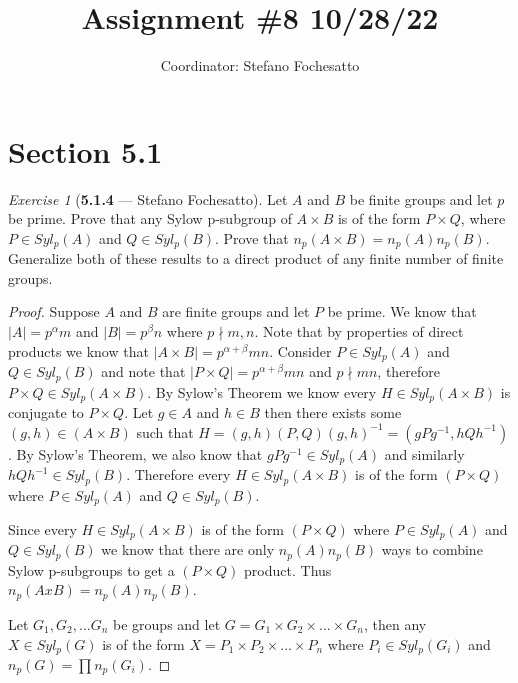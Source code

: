 \documentclass[12pt]{amsart}
\title{Assignment \#8 10/28/22}
\author{Coordinator: Stefano Fochesatto}
\theoremstyle{remark}
\newtheorem*{exercise}{Exercise}%
\theoremstyle{mycomment}
\begin{document}
\maketitle
\doublespacing %

\section*{Section 5.1}
\begin{exercise}[\textbf{5.1.4} --- Stefano Fochesatto] Let $A$ and $B$ be finite groups and let $p$ be prime. Prove that any Sylow p-subgroup of $A\times B$
  is of the form $P\times Q$, where $P \in Syl_p(A)$ and $Q \in Syl_p(B)$. Prove that $n_p(A\times B) = n_p(A)n_p(B)$. Generalize both of these results 
  to a direct product of any finite number of finite groups.
  \begin{proof} Suppose $A$ and $B$ are finite groups and let $P$ be prime. We know that $|A| = p^{\alpha}m$ and $|B| = p^{\beta}n$ where $p \nmid m, n$.
    Note that by properties of direct products we know that $|A \times B| = p^{\alpha + \beta}mn$. Consider $P \in Syl_p(A)$ and $Q \in Syl_p(B)$ and note that $|P \times Q| = p^{\alpha + \beta}mn$ and $p \nmid mn$, therefore $P \times Q \in Syl_p(A \times B)$. By Sylow's Theorem we know every $H \in Syl_p(A\times B)$ is conjugate to $P \times Q$. Let $g \in A$ and $h \in B$ then there exists some $(g, h) \in (A \times B)$ such that $H = (g, h)(P, Q)(g, h)^{-1} = (gPg^{-1}, hQh^{-1})$. By Sylow's Theorem, we also know that $gPg^{-1} \in Syl_p(A)$ and similarly $hQh^{-1} \in Syl_p(B)$. Therefore every $H \in Syl_p(A\times B)$ is of the form $(P\times Q)$ where $P \in Syl_p(A)$ and $Q \in Syl_p(B)$.


    Since every $H \in Syl_p(A\times B)$ is of the form $(P\times Q)$ where $P \in Syl_p(A)$ and $Q \in Syl_p(B)$ we know that there are only 
    $n_p(A)n_p(B)$ ways to combine Sylow p-subgroups to get a $(P\times Q)$ product. Thus $n_p(AxB) = n_p(A)n_p(B)$.


    Let $G_1, G_2, \dots G_n$ be groups and let $G = G_1 \times  G_2 \times  \dots \times  G_n$, then any $X \in Syl_p(G)$ is of the form 
    $X = P_1 \times  P_2 \times \dots \times P_n$ where $P_i \in Syl_p(G_i)$ and $n_p(G) = \prod n_p(G_i)$. 

  \end{proof}
\end{exercise}
\vspace{.15in}
\end{document}
